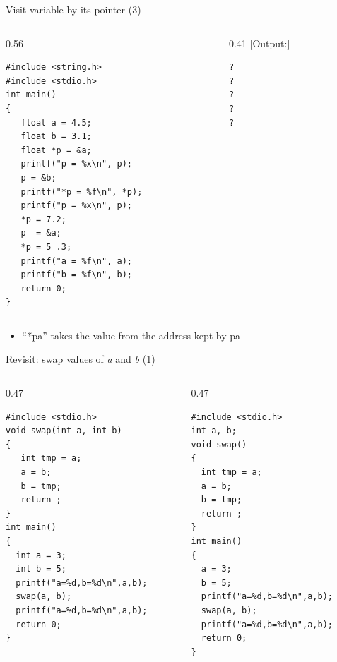 \begin{frame}[fragile]{Visit variable by its pointer (3)}
\vspace{-0.15in}
\begin{columns}
\begin{column}{0.56\linewidth}
\begin{lstlisting}[xleftmargin=0.02\linewidth, linewidth=0.98\linewidth]
#include <string.h>
#include <stdio.h>
int main()
{
   float a = 4.5;
   float b = 3.1;
   float *p = &a;
   printf("p = %x\n", p);
   p = &b;
   printf("*p = %f\n", *p);
   printf("p = %x\n", p);
   *p = 7.2;
   p  = &a;
   *p = 5 .3;
   printf("a = %f\n", a);
   printf("b = %f\n", b);
   return 0;
}
\end{lstlisting}
\end{column}
\begin{column}{0.41\linewidth}
[Output:]
\begin{lstlisting}
?
?
?
?
?
\end{lstlisting}
\end{column}
\end{columns}
\vspace{-0.1in}
\begin{itemize}
	\item {``*pa'' takes the value from the address kept by pa}
\end{itemize}
\end{frame}

\begin{frame}[fragile]{Revisit: swap values of \textit{a} and \textit{b} (1)}
\vspace{-0.25in}
\begin{columns}
\begin{column}{0.47\linewidth}
\begin{lstlisting}
#include <stdio.h>
void swap(int a, int b)
{
   int tmp = a;
   a = b;
   b = tmp;
   return ;
}
int main()
{
  int a = 3; 
  int b = 5;
  printf("a=%d,b=%d\n",a,b);
  swap(a, b);
  printf("a=%d,b=%d\n",a,b);
  return 0;
}
\end{lstlisting}
\end{column}
\begin{column}{0.47\linewidth}
\begin{lstlisting}[xleftmargin=0.005\linewidth]
#include <stdio.h>
int a, b;
void swap()
{
  int tmp = a;
  a = b;
  b = tmp;
  return ;
}
int main()
{
  a = 3; 
  b = 5;
  printf("a=%d,b=%d\n",a,b);
  swap(a, b);
  printf("a=%d,b=%d\n",a,b);
  return 0;
}
\end{lstlisting}
\end{column}
\end{columns}
\end{frame}

